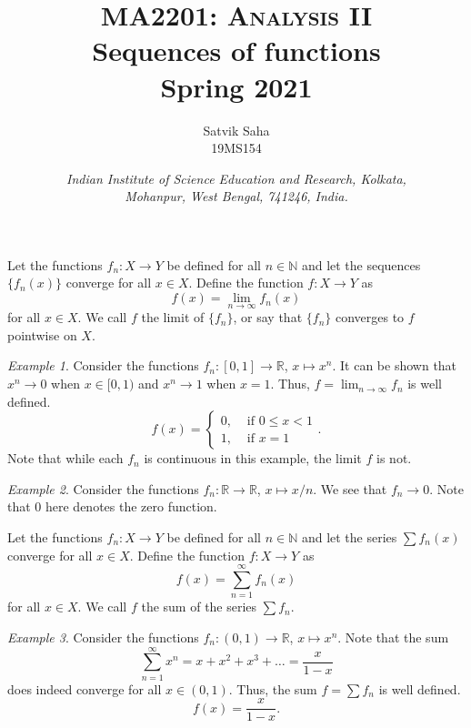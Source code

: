 \documentclass[11pt]{article}
\title{
    \Large\textsc{MA2201: Analysis II} \\
    \Huge \textbf{Sequences of functions} \\
    \vspace{5pt}
    \Large{Spring 2021}
}
\author{
    \large Satvik Saha%
    \\\textsc{\small 19MS154}
}
\date{\normalsize
    \textit{Indian Institute of Science Education and Research, Kolkata, \\
    Mohanpur, West Bengal, 741246, India.} \\
}
\def\R{\mathbb{R}}
\theoremstyle{definition}
\theoremstyle{remark}
\newtheorem*{example}{Example}
\numberwithin{equation}{module}
\begin{document}
    \maketitle

    \begin{definition}
        Let the functions $f_n\colon X \to Y$ be defined for all $n \in \mathbb{N}$
        and let the sequences $\{f_n(x)\}$ converge for all $x \in X$. Define the
        function $f\colon X \to Y$ as \[
            f(x) = \lim_{n \to \infty} f_n(x) 
        \] for all $x \in X$. We call $f$ the limit of $\{f_n\}$, or say that
        $\{f_n\}$ converges to $f$ pointwise on $X$.
    \end{definition}
    \begin{example}
        Consider the functions $f_n\colon [0, 1] \to \R$, $x \mapsto x^n$.
        It can be shown that $x^n \to 0$ when $x \in [0, 1)$ and 
        $x^n \to 1$ when $x = 1$. Thus, $f = \lim_{n \to \infty} f_n$ is well
        defined. \[
            f(x) = \begin{cases}
                0, &\text{ if } 0 \leq x < 1 \\
                1, &\text{ if } x = 1
            \end{cases}.
        \] 
        Note that while each $f_n$ is continuous in this example, the limit $f$
        is not.
    \end{example}
    \begin{example}
        Consider the functions $f_n\colon \R \to \R$, $x \mapsto x/n$.
        We see that $f_n \to 0$. Note that $0$ here denotes the zero function.
    \end{example}
    
    \begin{definition}
        Let the functions $f_n\colon X \to Y$ be defined for all $n \in \mathbb{N}$
        and let the series $\sum f_n(x)$ converge for all $x \in X$.
        Define the function $f\colon X \to Y$ as \[
            f(x) = \sum_{n = 1}^\infty f_n(x)
        \] for all $x \in X$. We call $f$ the sum of the series $\sum f_n$.
    \end{definition}
    \begin{example}
        Consider the functions $f_n\colon (0, 1) \to \R$, $x \mapsto x^n$.
        Note that the sum \[
            \sum_{n = 1}^{\infty} x^n = x + x^2 + x^3 + \dots 
                = \frac{x}{1 - x} 
        \] does indeed converge for all $x \in (0, 1)$. Thus, the sum $f = \sum f_n$
        is well defined. \[
            f(x) = \frac{x}{1 - x}.
        \] 
    \end{example}
\end{document}
